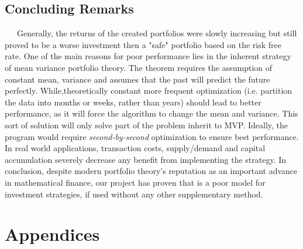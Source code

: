 \documentclass[12pt,titlepage,letter]{article}
\begin{document}
	\subsection{Concluding Remarks}
		\ \ \ Generally, the returns of the created portfolios were slowly increasing but still proved to be a worse investment then a "safe" portfolio based on the risk free rate. One of the main reasons for poor performance lies in the inherent strategy of mean variance portfolio theory. The theorem requires the assumption of constant mean, variance and assumes that the past will predict the future perfectly. While,theoretically constant more frequent optimization (i.e. partition the data into months or weeks, rather than years) should lead to better performance, as it will force the algorithm to change the mean and variance. This sort of solution will only solve part of the problem inherit to MVP. Ideally, the program would require \textit{second-by-second} optimization to ensure best performance. In real world applications, transaction costs, supply/demand and capital accumulation severely decrease any benefit from implementing the strategy.  In conclusion, despite modern portfolio theory's reputation as an important advance in mathematical finance, our project has proven that is a poor model for investment strategies, if used without any other supplementary method.
\newpage

\section{Appendices}
\end{document}
